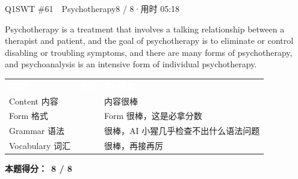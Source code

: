 \begin{qblock}{Q1\quad SWT \#61\ \ Psychotherapy}{8 / 8\quad·\quad 用时 05:18}
\begin{youbox}
Psychotherapy is a treatment that involves a talking relationship between a therapist and patient, and the goal of psychotherapy is to eliminate or control disabling or troubling symptoms, and there are many forms of psychotherapy, and psychoanalysis is an intensive form of individual psychotherapy.
\end{youbox}

{\small\scorehead
\begin{tabularx}{\linewidth}{l c Y}
\textcolor{white}{\bfseries 维度} & \textcolor{white}{\bfseries 得分} & \textcolor{white}{\bfseries AI 建议}\\
Content 内容        &  & 内容很棒\\
Form 格式          &  & Form 很棒，这是必拿分数\\
Grammar 语法       &  & 很棒，AI 小猩几乎检查不出什么语法问题\\
Vocabulary 词汇    &  & 很棒，再接再厉\\
\end{tabularx}}
\smallskip
\textbf{本题得分：}\ {\color{cAccent}\bfseries 8 / 8}

\end{qblock}


